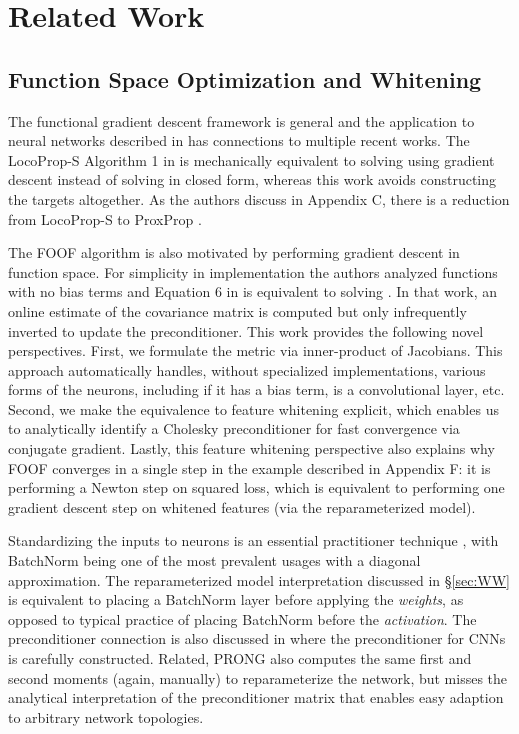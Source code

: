 \section{Related Work}
\label{sec:connections}
\subsection{Function Space Optimization and Whitening}
The functional gradient descent framework is general and the 
application to neural networks described in \citet{grub2010} has connections to
multiple recent works. The LocoProp-S Algorithm 1 in \citet{locoprop}
is mechanically equivalent to solving  using gradient descent
instead of solving in closed form, whereas this work avoids constructing the targets altogether.
As the authors discuss in Appendix C,
there is a reduction from LocoProp-S to ProxProp \citep{proxprop}.

The FOOF algorithm \citep{foof} is also motivated by performing gradient descent
in function space. For simplicity in implementation the authors analyzed functions
with no bias terms and Equation 6 in \citet{foof} is equivalent to
solving . In that work, an online estimate of the 
covariance matrix is computed but only infrequently inverted to update the
preconditioner. This work provides the following novel perspectives. First, 
we formulate the metric via inner-product of Jacobians. This approach
automatically handles, without specialized implementations, various forms of the neurons,
including if it has a bias term, is a convolutional layer, etc. 
Second, we make the equivalence to feature whitening explicit, which enables 
us to analytically identify a Cholesky preconditioner for fast convergence via
conjugate gradient. Lastly, this feature whitening perspective also
explains why FOOF converges in a single step in the example described in Appendix F:
it is performing a Newton step on squared loss, which is equivalent to performing one
gradient descent step on whitened features (via the reparameterized model).

Standardizing the inputs to neurons is an essential practitioner technique \citep{LeCun2012},
with BatchNorm \citep{batchnorm} being one of the most prevalent
usages with a diagonal approximation. The reparameterized model interpretation discussed in
\S \ref{sec:WW} is equivalent to placing a BatchNorm layer before applying the \emph{weights},
as opposed to typical practice of placing BatchNorm before the
\emph{activation}. The preconditioner connection is also discussed in \citep{lange}
where the preconditioner for CNNs is carefully constructed.
Related, PRONG \cite{nnn} also computes the same first and
second moments (again, manually) to reparameterize the network, but misses the analytical interpretation
of the preconditioner matrix that enables easy adaption to arbitrary network topologies.


